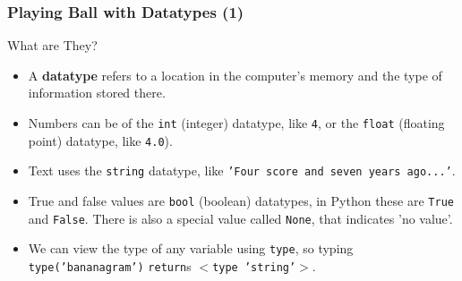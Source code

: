\documentclass[10pt]{beamer}
\begin{document}
\begin{frame}
  \frametitle{Playing Ball with Datatypes (1)}
  \begin{block}{What are They?}
    \begin{itemize}
      \item A \textbf{datatype} refers to a location in the computer's memory and the type of information stored there.
      \item Numbers can be of the \texttt{int} (integer) datatype, like \texttt{4}, or the \texttt{float} (floating point) datatype, like \texttt{4.0}).
      \item Text uses the \texttt{string} datatype, like \texttt{'Four score and seven years ago...'}.
      \item True and false values are \texttt{bool} (boolean) datatypes, in Python these are \texttt{True} and \texttt{False}.
        There is also a special value called \texttt{None}, that indicates 'no value'.
      \item We can view the type of any variable using \texttt{type}, so typing \texttt{type('bananagram')}  \texttt{return}s \texttt{$<$type 'string'$>$}.
    \end{itemize}
  \end{block}
\end{frame}
\end{document}
